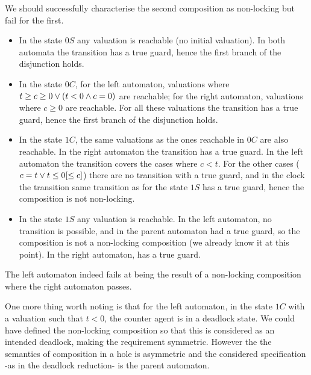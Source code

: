 \documentclass{article}
\begin{document}
\begin{exi}
We should successfully characterise the second composition as non-locking but fail for the first.
\begin{itemize}
\item In the state \(0S\) any valuation is reachable (no initial valuation).
	In both automata the transition  has a true guard, hence the first branch of the disjunction holds.
\item In the state \(0C\), for the left automaton, valuations where \(t \geq c \geq 0 \vee {\left(t < 0 \wedge c = 0\right)}\) are reachable; for the right automaton, valuations where \(c \geq 0\) are reachable.
	For all these valuations the transition  has a true guard, hence the first branch of the disjunction holds.
\item In the state \(1C\), the same valuations as the ones reachable in \(0C\) are also reachable.
	In the right automaton the transition  has a true guard.
	In the left automaton the transition  covers the cases where \(c < t\).
	For the other cases (\(c = t \vee t \leq 0 {\left[\leq c\right]}\)) there are no transition with a true guard, and in the clock the transition same transition as for the state \(1S\) has a true guard, hence the composition is not non-locking.
\item In the state \(1S\) any valuation is reachable.
	In the left automaton, no transition is possible, and in the parent automaton  had a true guard, so the composition is not a non-locking composition (we already know it at this point).
	In the right automaton,  has a true guard.
\end{itemize}
The left automaton indeed fails at being the result of a non-locking composition where the right automaton passes.

One more thing worth noting is that for the left automaton, in the state \(1C\) with a valuation such that \(t < 0\), the counter agent is in a deadlock state.
We could have defined the non-locking composition so that this is considered as an intended deadlock, making the requirement symmetric.
However the the semantics of composition in a hole is asymmetric and the considered specification -as in the deadlock reduction- is the parent automaton.
\end{exi}
\end{document}
